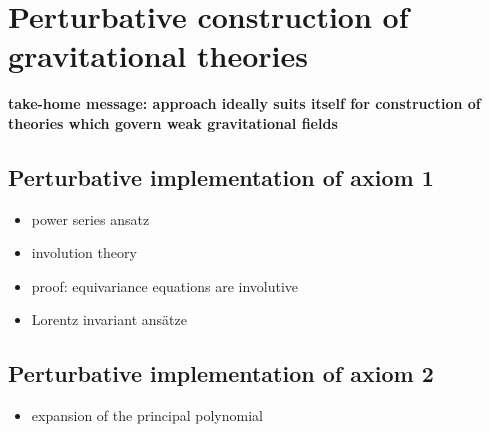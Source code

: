 \chapter{Perturbative construction of gravitational theories}
\label{chapter_perturbation}

\textbf{take-home message: approach ideally suits itself for construction of theories which govern weak gravitational fields}

\section{Perturbative implementation of axiom 1}
\begin{itemize}
\item power series ansatz
\item involution theory
\item proof: equivariance equations are involutive
\item Lorentz invariant ansätze
\end{itemize}

\section{Perturbative implementation of axiom 2}
\begin{itemize}
\item expansion of the principal polynomial
\end{itemize}

